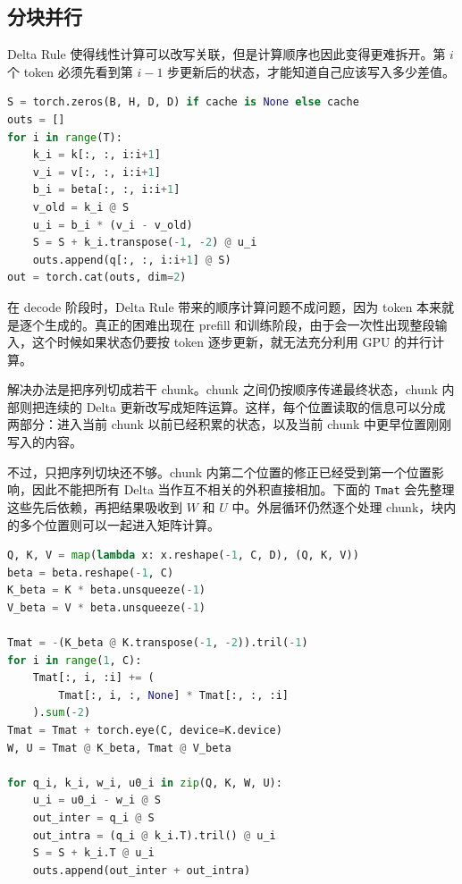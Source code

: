 \subsection{分块并行}

Delta Rule 使得线性计算可以改写关联，但是计算顺序也因此变得更难拆开。第 $i$ 个 token 必须先看到第 $i-1$ 步更新后的状态，才能知道自己应该写入多少差值。

\begin{lstlisting}[language=Python,caption={顺序执行的 Delta 更新}]
S = torch.zeros(B, H, D, D) if cache is None else cache
outs = []
for i in range(T):
    k_i = k[:, :, i:i+1]
    v_i = v[:, :, i:i+1]
    b_i = beta[:, :, i:i+1]
    v_old = k_i @ S
    u_i = b_i * (v_i - v_old)
    S = S + k_i.transpose(-1, -2) @ u_i
    outs.append(q[:, :, i:i+1] @ S)
out = torch.cat(outs, dim=2)
\end{lstlisting}

在 decode 阶段时，Delta Rule 带来的顺序计算问题不成问题，因为 token 本来就是逐个生成的。真正的困难出现在 prefill 和训练阶段，由于会一次性出现整段输入，这个时候如果状态仍要按 token 逐步更新，就无法充分利用 GPU 的并行计算。

解决办法是把序列切成若干 chunk。chunk 之间仍按顺序传递最终状态，chunk 内部则把连续的 Delta 更新改写成矩阵运算。这样，每个位置读取的信息可以分成两部分：进入当前 chunk 以前已经积累的状态，以及当前 chunk 中更早位置刚刚写入的内容。

不过，只把序列切块还不够。chunk 内第二个位置的修正已经受到第一个位置影响，因此不能把所有 Delta 当作互不相关的外积直接相加。下面的 \texttt{Tmat} 会先整理这些先后依赖，再把结果吸收到 $W$ 和 $U$ 中。外层循环仍然逐个处理 chunk，块内的多个位置则可以一起进入矩阵计算。

\begin{lstlisting}[language=Python,caption={重参数化后的 chunk Delta 核心}]
Q, K, V = map(lambda x: x.reshape(-1, C, D), (Q, K, V))
beta = beta.reshape(-1, C)
K_beta = K * beta.unsqueeze(-1)
V_beta = V * beta.unsqueeze(-1)

Tmat = -(K_beta @ K.transpose(-1, -2)).tril(-1)
for i in range(1, C):
    Tmat[:, i, :i] += (
        Tmat[:, i, :, None] * Tmat[:, :, :i]
    ).sum(-2)
Tmat = Tmat + torch.eye(C, device=K.device)
W, U = Tmat @ K_beta, Tmat @ V_beta

for q_i, k_i, w_i, u0_i in zip(Q, K, W, U):
    u_i = u0_i - w_i @ S
    out_inter = q_i @ S
    out_intra = (q_i @ k_i.T).tril() @ u_i
    S = S + k_i.T @ u_i
    outs.append(out_inter + out_intra)
\end{lstlisting}

